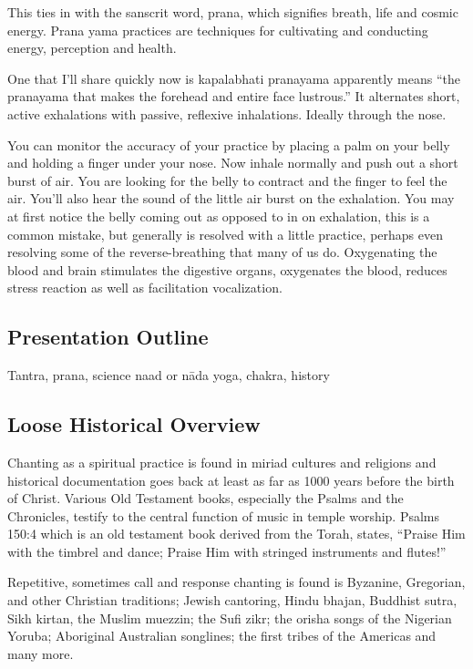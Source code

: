 \documentclass[12pt]{article}
\begin{document}
This ties in with the sanscrit word, prana, which signifies breath, life and cosmic energy. Prana yama practices are techniques for cultivating and conducting energy, perception and health.

One that I'll share quickly now is kapalabhati pranayama apparently means “the pranayama that makes the forehead and entire face lustrous.” It alternates short, active exhalations with passive, reflexive inhalations. Ideally through the nose.

You can monitor the accuracy of your practice by placing a palm on your belly and holding a finger under your nose. Now inhale normally and push out a short burst of air. You are looking for the belly to contract and the finger to feel the air. You'll also hear the sound of the little air burst on the exhalation. You may at first notice the belly coming out as opposed to in on exhalation, this is a common mistake, but generally is resolved with a little practice, perhaps even resolving some of the reverse-breathing that many of us do. Oxygenating the blood and brain stimulates the digestive organs, oxygenates the blood, reduces stress reaction as well as facilitation vocalization.

\subsection*{Presentation Outline}

Tantra, prana, science naad or nāda yoga, chakra, history

\subsection*{Loose Historical Overview}

Chanting as a spiritual practice is found in miriad cultures and religions and historical documentation goes back at least as far as 1000 years before the birth of Christ. Various Old Testament books, especially the Psalms and the Chronicles, testify to the central function of music in temple worship. Psalms 150:4 which is an old testament book derived from the Torah, states, “Praise Him with the timbrel and dance; Praise Him with stringed instruments and flutes!”

Repetitive, sometimes call and response chanting is found is Byzanine, Gregorian, and other Christian traditions; Jewish cantoring, Hindu bhajan, Buddhist sutra, Sikh kirtan, the Muslim muezzin; the Sufi zikr; the orisha songs of the Nigerian Yoruba; Aboriginal Australian songlines; the first tribes of the Americas and many more.
\end{document}
